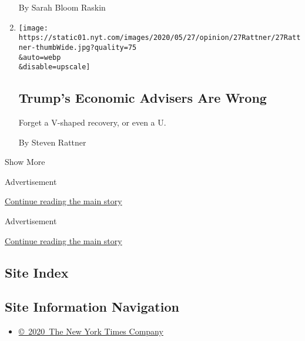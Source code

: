 \begin{enumerate}
  By Sarah Bloom Raskin
\item
  \href{/2020/05/27/opinion/coronavirus-economy-stimulus.html}{}

  \texttt{[image: https://static01.nyt.com/images/2020/05/27/opinion/27Rattner/27Rattner-thumbWide.jpg?quality=75\\\&auto=webp\\\&disable=upscale]}

  \hypertarget{trumps-economic-advisers-are-wrong}{%
  \subsection{Trump's Economic Advisers Are
  Wrong}\label{trumps-economic-advisers-are-wrong}}

  Forget a V-shaped recovery, or even a U.

  By Steven Rattner
\end{enumerate}

Show More

Advertisement

\protect\hyperlink{after-mid1}{Continue reading the main story}

Advertisement

\protect\hyperlink{after-mktg}{Continue reading the main story}

\hypertarget{site-index}{%
\subsection{Site Index}\label{site-index}}

\hypertarget{site-information-navigation}{%
\subsection{Site Information
Navigation}\label{site-information-navigation}}

\begin{itemize}
\tightlist
\item
  \href{https://help.nytimes.com/hc/en-us/articles/115014792127-Copyright-notice}{©~2020~The
  New York Times Company}
\end{itemize}

